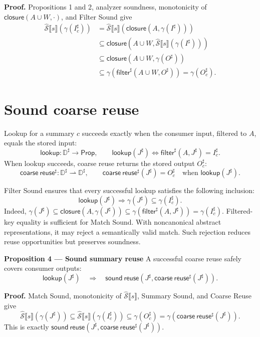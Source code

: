 \documentclass[10pt]{article}
\newcommand{\REV}[1]{{\color{reviewpink}#1}}
\newcommand{\boxheading}[1]{\textbf{#1}\quad}
\newcommand{\CollectingSemantics}[1]{\widehat{\mathcal S}\mathopen{⟦}#1\mathclose{⟧}}
\newcommand{\ProjClose}{\mathsf{closure}}
\newcommand{\filter}{\mathsf{filter}}
\newcommand{\reuse}{\mathsf{coarse\ reuse}}
\newcommand{\Lookup}{\mathsf{lookup}}
\newcommand{\SoundReuse}{\mathsf{sound\ reuse}}
\newcommand{\qedbox}{\hfill\raisebox{0.15ex}{\fboxsep=0pt\fbox{\rule{0pt}{0.55em}\rule{0.55em}{0pt}}}}
\providecommand{\DIFaddtex}[1]{{\protect\color{blue} #1}} %
\providecommand{\DIFaddbegin}{} %
\providecommand{\DIFaddend}{} %
\providecommand{\DIFadd}[1]{\texorpdfstring{\DIFaddtex{#1}}{#1}} %
\begin{document}
\textbf{Proof.}
Propositions 1 and 2, analyzer soundness, monotonicity of \(\ProjClose(A\cup W,\cdot)\), and
Filter Sound give
\begin{align*}
  \CollectingSemantics{s}\!\left(\gamma(I_c^\sharp)\right)
  &=\CollectingSemantics{s}\!\left(\ProjClose(A,\gamma(I^\sharp))\right)\\
  &\subseteq\ProjClose\!\left(A\cup W,
      \CollectingSemantics{s}(\gamma(I^\sharp))\right)\\
  &\subseteq\ProjClose\!\left(A\cup W,\gamma(O^\sharp)\right)\\
  &\subseteq\gamma\!\left(\filter^\sharp(A\cup W,O^\sharp)\right)
   =\gamma(O_c^\sharp).
\end{align*}
\qedbox

\section{Sound coarse reuse}

Lookup for a summary \(c\) succeeds exactly when the consumer input, filtered to \(A\), equals
the stored input:
\[
  \Lookup:\mathbb D^\sharp\to\mathsf{Prop},
  \qquad
  \Lookup(J^\sharp)
  \Longleftrightarrow
  \filter^\sharp(A,J^\sharp)=I_c^\sharp.
\]
When lookup succeeds, coarse reuse returns the stored output \(O_c^\sharp\):
\[
  \reuse^\sharp:\mathbb D^\sharp\rightharpoonup\mathbb D^\sharp,
  \qquad
  \reuse^\sharp(J^\sharp)=O_c^\sharp
  \quad\text{when }\Lookup(J^\sharp).
  \tag{Coarse Reuse}
\]

Filter Sound ensures that every successful lookup satisfies the following inclusion:
\[
  \Lookup(J^\sharp)
  \Longrightarrow
  \gamma(J^\sharp)\subseteq\gamma(I_c^\sharp).
  \tag{Match Sound}
\]
Indeed, \(\gamma(J^\sharp)\subseteq
\ProjClose(A,\gamma(J^\sharp))\subseteq
\gamma(\filter^\sharp(A,J^\sharp))=\gamma(I_c^\sharp)\).
\DIFaddbegin \DIFadd{\REV{Filtered-key equality is sufficient for Match Sound. With noncanonical abstract representations,
it may reject a semantically valid match. Such rejection reduces reuse opportunities but preserves
soundness.}
}\DIFaddend

\begin{statementbox}
\boxheading{Proposition 4 --- Sound summary reuse}
A successful coarse reuse safely covers consumer outputs:
\[
  \Lookup(J^\sharp)
  \quad\Longrightarrow\quad
  \SoundReuse\!\left(J^\sharp,\reuse^\sharp(J^\sharp)\right).
\]
\end{statementbox}

\textbf{Proof.}
Match Sound, monotonicity of \(\CollectingSemantics{s}\), Summary Sound, and Coarse Reuse give
\[
  \CollectingSemantics{s}\!\left(\gamma(J^\sharp)\right)
  \subseteq
  \CollectingSemantics{s}\!\left(\gamma(I_c^\sharp)\right)
  \subseteq\gamma(O_c^\sharp)
  =\gamma\!\left(\reuse^\sharp(J^\sharp)\right).
\]
This is exactly \(\SoundReuse(J^\sharp,\reuse^\sharp(J^\sharp))\). \qedbox
\end{document}

